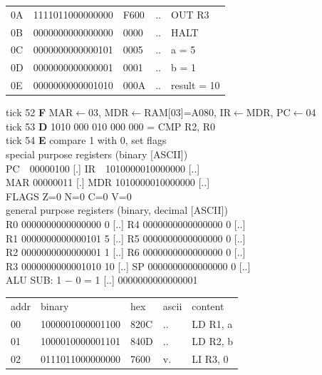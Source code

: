 \begin{tcolorbox}[stepbox, title={Instruction 17 \hfill ticks 49 to 51 \quad JMP loop}]
{\begin{tabular}{@{}lllll@{}}
0A & 1111011000000000 & F600 & .. & OUT R3\\
0B & 0000000000000000 & 0000 & .. & HALT\\
\rowcolor{datac}0C & 0000000000000101 & 0005 & .. & a = 5\\
\rowcolor{datac}0D & 0000000000000001 & 0001 & .. & b = 1\\
\rowcolor{datac}0E & 0000000000001010 & 000A & .. & result = 10\\
\end{tabular}}
\end{tcolorbox}\hfill\begin{tcolorbox}[stepbox, title={Instruction 18 \hfill ticks 52 to 54 \quad CMP R2, R0}]
\textcolor{dim}{tick 52} \textbf{F} MAR$\leftarrow$03, MDR$\leftarrow$RAM[03]=A080, IR$\leftarrow$MDR, PC$\leftarrow$04\\
\textcolor{dim}{tick 53} \textbf{D} 1010 000 010 000 000 = CMP R2, R0\\
\textcolor{dim}{tick 54} \textbf{E} compare 1 with 0, set flags\\[2pt]
\textcolor{dim}{special purpose registers (binary [ASCII])}\\
PC~~00000100 [.] \hfill IR~~1010000010000000 [..]\\
MAR 00000011 [.] \hfill MDR 1010000010000000 [..]\\
FLAGS Z=0 N=0 C=0 V=0\\[2pt]
\textcolor{dim}{general purpose registers (binary, decimal [ASCII])}\\
R0 0000000000000000 0 [..] \hfill R4 0000000000000000 0 [..]\\
R1 0000000000000101 5 [..] \hfill R5 0000000000000000 0 [..]\\
R2 0000000000000001 1 [..] \hfill R6 0000000000000000 0 [..]\\
R3 0000000000001010 10 [..] \hfill SP 0000000000000000 0 [..]\\
\textcolor{dim}{ALU} SUB: 1 $-$ 0 = 1 [..] \hfill 0000000000000001\\[2pt]
{\setlength{\tabcolsep}{2pt}\begin{tabular}{@{}lllll@{}}
\textcolor{dim}{addr} & \textcolor{dim}{binary} & \textcolor{dim}{hex} & \textcolor{dim}{ascii} & \textcolor{dim}{content}\\
00 & 1000001000001100 & 820C & .. & LD R1, a\\
01 & 1000010000001101 & 840D & .. & LD R2, b\\
02 & 0111011000000000 & 7600 & v. & LI R3, 0\\

\end{tabular}}
\end{tcolorbox}
